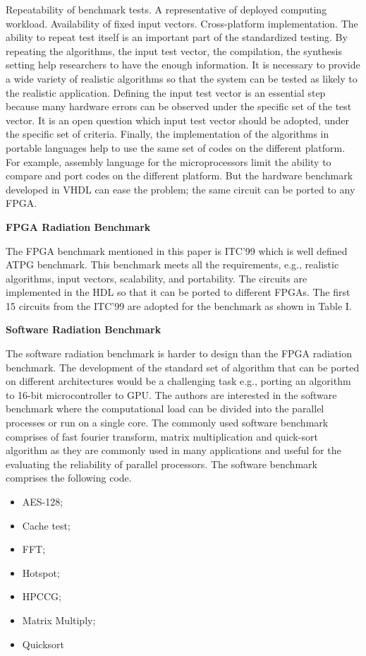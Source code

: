 Repeatability of benchmark tests.
A representative of deployed computing workload.
Availability of fixed input vectors.
Cross-platform implementation.
The ability to repeat test itself is an important part of the standardized testing. By repeating the algorithms, the input test vector, the compilation, the synthesis setting help researchers to have the enough information. It is necessary to provide a wide variety of realistic algorithms so that the system can be tested as likely to the realistic application. Defining the input test vector is an essential step because many hardware errors can be observed under the specific set of the test vector. It is an open question which input test vector should be adopted, under the specific set of criteria. Finally, the implementation of the algorithms in portable languages help to use the same set of codes on the different platform. For example, assembly language for the microprocessors limit the ability to compare and port codes on the different platform. But the hardware benchmark developed in VHDL can ease the problem; the same circuit can be ported to any FPGA.

\textbf{FPGA Radiation Benchmark}

The FPGA benchmark mentioned in this paper is ITC'99 which is well defined ATPG benchmark. This benchmark meets all the requirements, e.g., realistic algorithms, input vectors, scalability, and portability. The circuits are implemented in the HDL so that it can be ported to different FPGAs. The first 15 circuits from the ITC'99 are adopted for the benchmark as shown in Table I.

\textbf{Software Radiation Benchmark}

The software radiation benchmark is harder to design than the FPGA radiation benchmark. The development of the standard set of algorithm that can be ported on different architectures would be a challenging task e.g., porting an algorithm to 16-bit microcontroller to GPU. The authors are interested in the software benchmark where the computational load can be divided into the parallel processes or run on a single core. The commonly used software benchmark comprises of fast fourier transform, matrix multiplication and quick-sort algorithm as they are commonly used in many applications and useful for the evaluating the reliability of parallel processors. The software benchmark comprises the following code.

\begin{itemize}
\item AES-128;
\item Cache test;
\item FFT;
\item Hotspot;
\item HPCCG;
\item Matrix Multiply;
\item Quicksort
\end{itemize}





